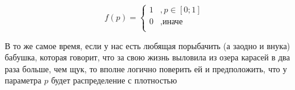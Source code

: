\begin{figure}[H]
\begin{minipage}[H]{0.39\linewidth}
\begin{center}
\[ f(p) = \begin{cases}
             1&, p \in [0;1] \\
             0&, \text{иначе}\\
            \end{cases} \]
\end{center}
\end{minipage}
\hfill
\begin{minipage}[H]{0.59\linewidth}
\begin{center}
\end{center}
\end{minipage}
\end{figure}

В то же самое время, если у нас есть любящая порыбачить (а заодно и внука) бабушка, которая говорит, что за свою жизнь выловила из озера карасей в два раза больше, чем щук, то вполне логично поверить ей и предположить, что у параметра $p$ будет распределение с плотностью

